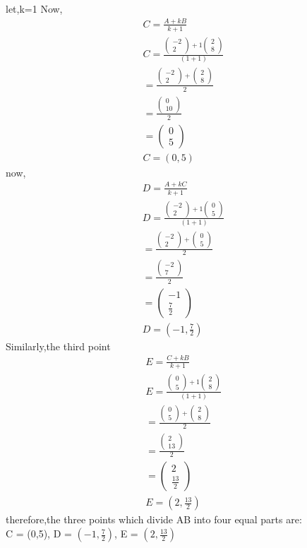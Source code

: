 \documentclass[journal,10pt,twocolumn]{article}
\newcommand{\myvec}[1]{\ensuremath{\begin{pmatrix}#1\end{pmatrix}}}
\begin{document}
\begin{enumerate}
   let,k=1 
Now, 
\begin{align}
C = \frac{A+kB}{k+1}\\
C = \frac{\myvec{-2\\2}+1\myvec{2\\8}}{(1+1)}\\
= \frac{\myvec{-2\\2}+\myvec{2\\8}}{2}\\
= \frac{\myvec{0\\10}}{2}\\
 = \myvec{0\\5}\\
C = (0,5)
\end{align}	
now, 
\begin{align}
D = \frac{A+kC}{k+1}\\
D = \frac{\myvec{-2\\2}+1\myvec{0\\5}}{(1+1)}\\
= \frac{\myvec{-2\\2}+\myvec{0\\5}}{2}\\
= \frac{\myvec{-2\\7}}{2}\\
= \myvec{-1\\\frac{7}{2}}\\
D = (-1,\frac{7}{2})
\end{align}
Similarly,the third point 
\begin{align}
E = \frac{C+kB}{k+1}\\
E = \frac{\myvec{0\\5}+1\myvec{2\\8}}{(1+1)}\\
= \frac{\myvec{0\\5}+\myvec{2\\8}}{2}\\
= \frac{\myvec{2\\13}}{2}\\
 = \myvec{2\\\frac{13}{2}}\\
E = (2,\frac{13}{2})
\end{align}
therefore,the three points which divide AB into four equal parts are:\\
C = (0,5),
D = $(-1,\frac{7}{2})$,
E = $(2,\frac{13}{2})$
\end{enumerate}
\end{document}
